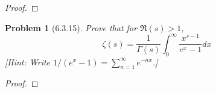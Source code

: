 \documentclass[10pt]{article}
\newcommand{\sk}{\vskip 10mm}
\theoremstyle{plain}
\newtheorem{problem}{Problem}
\theoremstyle{remark}
\begin{document}
\begin{proof}
  
\end{proof}

\sk

\begin{problem}[6.3.15]
  Prove that for $\Re(s)>1$,
  \[
    \zeta(s)=\frac{1}{\Gamma(s)}\int_0^\infty\frac{x^{s-1}}{e^x-1}dx
  \]
  [Hint: Write $1/(e^x-1)=\sum_{n=1}^\infty e^{-nx}$.]
\end{problem}

\begin{proof}
  
\end{proof}

\end{document}
